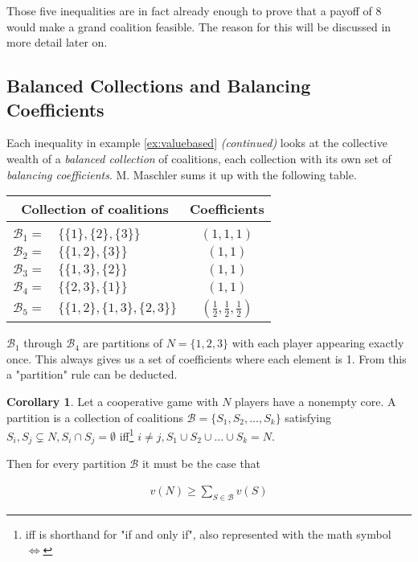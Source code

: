 \documentclass[10pt,a4paper,titlepage]{article}
\theoremstyle{plain}
\theoremstyle{definition}
\newtheorem{corollary}[thm]{Corollary}
\begin{document}
Those five inequalities are in fact already enough to prove that a payoff of 8 would make a grand coalition feasible. The reason for this will be discussed in more detail later on.




\subsection{Balanced Collections and Balancing Coefficients}
Each inequality in example \ref{ex:valuebased} \textit{(continued)} looks at the collective wealth of a \textit{balanced collection} of coalitions, each collection with its own set of \textit{balancing coefficients}. M. Maschler\cite{maschler} sums it up with the following table.\vspace{8pt}

\begin{tabular}{ | r l | c | }
    \multicolumn{2}{c}{Collection of coalitions} & \multicolumn{1}{c}{Coefficients}\\[2pt]
    \hline & & \\[-8pt]
    $\mathcal{B}_1 =$ & $\{\{1\}, \{2\}, \{3\}\}$ & $(1, 1, 1)$\\[2pt]
    $\mathcal{B}_2 =$ & $\{\{1, 2\}, \{3\}\}$ & $(1, 1)$\\[2pt]
    $\mathcal{B}_3 =$ & $\{\{1, 3\}, \{2\}\}$ & $(1, 1)$\\[2pt]
    $\mathcal{B}_4 =$ & $\{\{2, 3\}, \{1\}\}$ & $(1, 1)$\\[2pt]
    $\mathcal{B}_5 =$ & $\{\{1, 2\}, \{1, 3\}, \{2, 3\}\}$ & $(\frac{1}{2}, \frac{1}{2}, \frac{1}{2})$\\[2pt]
    \hline
\end{tabular}\vspace{8pt}

$\mathcal{B}_1$ through $\mathcal{B}_4$ are partitions of $N = \{1, 2, 3\}$ with each player appearing exactly once. This always gives us a set of coefficients where each element is 1. From this a "partition" rule can be deducted.

\begin{corollary}
    Let a cooperative game with $N$ players have a nonempty core. A partition is a collection of coalitions $\mathcal{B} = \{S_1, S_2, ..., S_k\}$ satisfying $S_i, S_j \subsetneq N, S_i \cap S_j = \emptyset$ iff\footnote{iff is shorthand for "if and only if", also represented with the math symbol $\Leftrightarrow$} $i \neq j, S_1 \cup S_2 \cup ... \cup S_k = N$.

    Then for every partition $\mathcal{B}$ it must be the case that

    \begin{align}
        v(N) \geq \sum_{S \in \mathcal{B}} v(S)
    \end{align}
\end{corollary}
\end{document}
